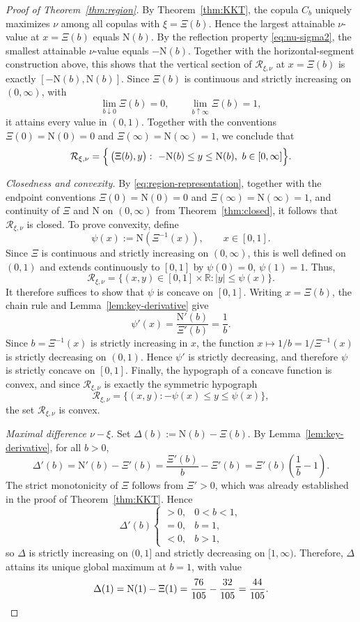 \documentclass{article}
\newcommand{\1}{\mathds{1}}
\newcommand{\R}{\mathbb{R}}
\newcommand{\NN}{\mathrm{N}}
\newcommand{\RR}{\mathcal{R}}
\begin{document}
\begin{proof}[Proof of Theorem~\ref{thm:region}]
By Theorem~\ref{thm:KKT}, the copula \(C_b\) uniquely maximizes \(\nu\) among all copulas with \(\xi=\Xi(b)\).
Hence the largest attainable \(\nu\)-value at \(x=\Xi(b)\) equals \(\NN(b)\).
By the reflection property \eqref{eq:nu-sigma2}, the smallest attainable \(\nu\)-value equals \(-\NN(b)\).
Together with the horizontal-segment construction above, this shows that the vertical section of \(\RR_{\xi,\nu}\) at \(x=\Xi(b)\) is exactly
\(
[-\NN(b),\NN(b)].
\)
Since $\Xi(b)$ is continuous and strictly increasing on $(0,\infty)$, with
\[
\lim_{b\downarrow 0}\Xi(b)=0,
\qquad
\lim_{b\uparrow\infty}\Xi(b)=1,
\]
it attains every value in $(0,1)$.
Together with the conventions $\Xi(0)=\NN(0)=0$ and $\Xi(\infty)=\NN(\infty)=1$, we conclude that
\begin{align}\label{eq:region-representation}
    \RR_{\xi,\nu}
    =\Bigl\{\,\bigl(\Xi(b),y\bigr):\ -\NN(b)\le y\le \NN(b),\ b\in[0,\infty]\Bigr\}.
\end{align}

\smallskip
\emph{Closedness and convexity.}
By \eqref{eq:region-representation}, together with the endpoint conventions
\(\Xi(0)=\NN(0)=0\) and \(\Xi(\infty)=\NN(\infty)=1\),
and continuity of \(\Xi\) and \(\NN\) on \((0,\infty)\) from Theorem~\ref{thm:closed},
it follows that \(\RR_{\xi,\nu}\) is closed.
To prove convexity, define
\[
\psi(x):=\NN(\Xi^{-1}(x)),\qquad x\in[0,1].
\]
Since \(\Xi\) is continuous and strictly increasing on \((0,\infty)\), this is well defined on \((0,1)\) and extends continuously to \([0,1]\) by \(\psi(0)=0\), \(\psi(1)=1\). Thus,
\[
\RR_{\xi,\nu}=\{(x,y)\in[0,1]\times\R: |y|\le \psi(x)\}.
\]
It therefore suffices to show that \(\psi\) is concave on \([0,1]\). Writing \(x=\Xi(b)\), the chain rule and Lemma~\ref{lem:key-derivative} give
\[
\psi'(x)
=
\frac{\NN'(b)}{\Xi'(b)}
=
\frac{1}{b}.
\]
Since \(b=\Xi^{-1}(x)\) is strictly increasing in \(x\), the function \(x\mapsto 1/b = 1/\Xi^{-1}(x)\) is strictly decreasing on \((0,1)\).
Hence \(\psi'\) is strictly decreasing, and therefore \(\psi\) is strictly concave on \([0,1]\).
Finally, the hypograph of a concave function is convex, and since \(\RR_{\xi,\nu}\) is exactly the symmetric hypograph
\[
\RR_{\xi,\nu}=\{(x,y): -\psi(x)\le y\le \psi(x)\},
\]
the set \(\RR_{\xi,\nu}\) is convex.

\smallskip
\smallskip
\emph{Maximal difference \(\nu-\xi\).}
Set \(\Delta(b):=\NN(b)-\Xi(b)\).
By Lemma~\ref{lem:key-derivative}, for all \(b>0\),
\[
\Delta'(b)
= \NN'(b)-\Xi'(b)
= \frac{\Xi'(b)}{b}-\Xi'(b)
= \Xi'(b)\!\left(\frac{1}{b}-1\right).
\]
The strict monotonicity of \(\Xi\) follows from $\Xi'>0$, which was already established in the proof of Theorem~\ref{thm:KKT}.
Hence
\[
\Delta'(b)\begin{cases}
>0, & 0<b<1,\\
=0, & b=1,\\
<0, & b>1,
\end{cases}
\]
so \(\Delta\) is strictly increasing on \((0,1]\) and strictly decreasing on \([1,\infty)\).
Therefore, \(\Delta\) attains its unique global maximum at \(b=1\), with value
\[
\Delta(1)
=\NN(1)-\Xi(1)
=\frac{76}{105}-\frac{32}{105}
=\frac{44}{105}.
\qedhere
\]
\end{proof}



\end{document}

